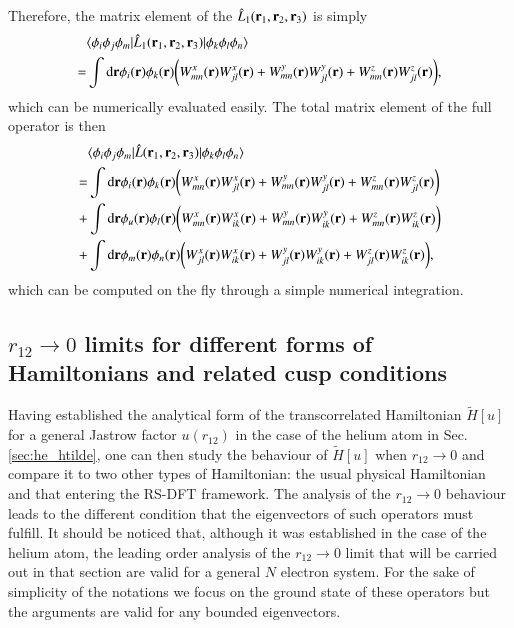 \documentclass[aip,jcp,reprint,noshowkeys,superscriptaddress,twocolumn]{revtex4-1}
\newcommand{\matelem}[3]{\langle #1 | #2 | #3 \rangle}
\newcommand{\bri}[1]{{\bf r}_{#1}}
\begin{document}
Therefore, the matrix element of the $\hat{L}_1(\bri{1},\bri{2},\bri{3})$ is simply 
\begin{equation}
 \begin{aligned}
 & \matelem{\phi_i \phi_j \phi_m}{\hat{L}_1(\bri{1},\bri{2},\bri{3})}{\phi_k \phi_l \phi_n} \\
 = & \int \text{d}{\bf r} \phi_i({\bf r})  \phi_k({\bf r}) \bigg( W_{mn}^x({\bf r}) W_{jl}^x({\bf r}) + W_{mn}^y({\bf r}) W_{jl}^y({\bf r}) + W_{mn}^z({\bf r}) W_{jl}^z({\bf r})\bigg),
 \end{aligned}
\end{equation}
which can be numerically evaluated easily. 
The total matrix element of the full operator is then 
\begin{equation}
 \label{eq:l_ijmkln_final}
 \begin{aligned}
 & \matelem{\phi_i \phi_j \phi_m}{\hat{L}(\bri{1},\bri{2},\bri{3})}{\phi_k \phi_l \phi_n} \\
 = & \int \text{d}{\bf r} \phi_i({\bf r})  \phi_k({\bf r}) \bigg( W_{mn}^x({\bf r}) W_{jl}^x({\bf r}) + W_{mn}^y({\bf r}) W_{jl}^y({\bf r}) + W_{mn}^z({\bf r}) W_{jl}^z({\bf r})\bigg) \\
 + & \int \text{d}{\bf r}\phi_u({\bf r})  \phi_l({\bf r}) \bigg( W_{mn}^x({\bf r}) W_{ik}^x({\bf r}) + W_{mn}^y({\bf r}) W_{ik}^y({\bf r}) + W_{mn}^z({\bf r}) W_{ik}^z({\bf r})\bigg) \\
 + & \int \text{d}{\bf r} \phi_m({\bf r})  \phi_n({\bf r}) \bigg( W_{jl}^x({\bf r}) W_{ik}^x({\bf r}) + W_{jl}^y({\bf r}) W_{ik}^y({\bf r}) + W_{jl}^z({\bf r}) W_{ik}^z({\bf r})\bigg), 
 \end{aligned}
\end{equation}
which can be computed on the fly through a simple numerical integration. 


\subsection{$r_{12} \rightarrow 0$ limits for different forms of Hamiltonians and related cusp conditions}
\label{sec:cusp}
Having established the analytical form of the transcorrelated Hamiltonian $\tilde{H}[u]$ for a general Jastrow factor $u(r_{12})$ in the case of the helium atom in Sec. \ref{sec:he_htilde}, one can then study the behaviour of $\tilde{H}[u]$ when $r_{12}\rightarrow 0$ and compare it to two other types of Hamiltonian: the usual physical Hamiltonian and that entering the RS-DFT framework. 
The analysis of the $r_{12}\rightarrow 0$ behaviour leads to the different condition that the eigenvectors of such operators must fulfill. 
It should be noticed that, although it was established in the case of the helium atom, the leading order analysis of the $r_{12} \rightarrow 0$ limit that will be carried out in that section are valid for a general $N$ electron system. 
For the sake of simplicity of the notations we focus on the ground state of these operators but the arguments are valid for any bounded eigenvectors. 
\end{document}
